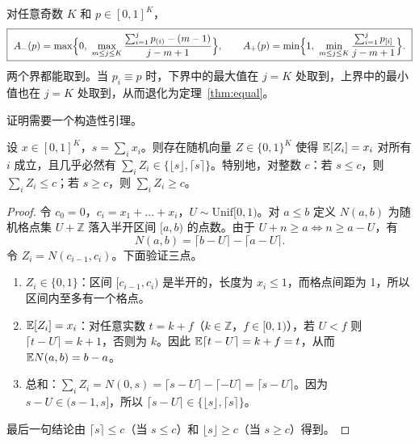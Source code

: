 \documentclass[11pt]{article}
\begin{document}
\begin{theorem}[任意边缘准确率的紧确界]\label{thm:unequal}
对任意奇数 $K$ 和 $p\in[0,1]^K$，
\[
\boxed{\ A_{-}(p)=\max\Bigl\{0,\ \max_{m\le j\le K}\frac{\sum_{i=1}^{j}p_{(i)}-(m-1)}{j-m+1}\Bigr\},\qquad
A_{+}(p)=\min\Bigl\{1,\ \min_{m\le j\le K}\frac{\sum_{i=1}^{j}p_{[i]}}{j-m+1}\Bigr\}.\ }
\]
两个界都能取到。当 $p_i\equiv p$ 时，下界中的最大值在 $j=K$ 处取到，上界中的最小值也在 $j=K$ 处取到，从而退化为定理~\ref{thm:equal}。
\end{theorem}

证明需要一个构造性引理。

\begin{lemma}[系统抽样引理]\label{lem:systematic}
设 $x\in[0,1]^K$，$s=\sum_i x_i$。则存在随机向量 $Z\in\{0,1\}^K$ 使得 $\mathbb{E}[Z_i]=x_i$ 对所有 $i$ 成立，且几乎必然有 $\sum_iZ_i\in\{\lfloor s\rfloor,\lceil s\rceil\}$。特别地，对整数 $c$：若 $s\le c$，则 $\sum_iZ_i\le c$；若 $s\ge c$，则 $\sum_iZ_i\ge c$。
\end{lemma}
\begin{proof}
令 $c_0=0$，$c_i=x_1+\dots+x_i$，$U\sim\mathrm{Unif}[0,1)$。对 $a\le b$ 定义 $N(a,b)$ 为随机格点集 $U+\mathbb Z$ 落入半开区间 $[a,b)$ 的点数。由于 $U+n\ge a\iff n\ge a-U$，有
\[
N(a,b)=\lceil b-U\rceil-\lceil a-U\rceil .
\]
令 $Z_i=N(c_{i-1},c_i)$。下面验证三点。
\begin{enumerate}[label=(\alph*)]
\item $Z_i\in\{0,1\}$：区间 $[c_{i-1},c_i)$ 是半开的，长度为 $x_i\le1$，而格点间距为 1，所以区间内至多有一个格点。
\item $\mathbb{E}[Z_i]=x_i$：对任意实数 $t=k+f$（$k\in\mathbb Z$，$f\in[0,1)$），若 $U<f$ 则 $\lceil t-U\rceil=k+1$，否则为 $k$。因此 $\mathbb{E}\lceil t-U\rceil=k+f=t$，从而 $\mathbb{E} N(a,b)=b-a$。
\item 总和：$\sum_iZ_i=N(0,s)=\lceil s-U\rceil-\lceil -U\rceil=\lceil s-U\rceil$。因为 $s-U\in(s-1,s]$，所以 $\lceil s-U\rceil\in\{\lfloor s\rfloor,\lceil s\rceil\}$。
\end{enumerate}
最后一句结论由 $\lceil s\rceil\le c$（当 $s\le c$）和 $\lfloor s\rfloor\ge c$（当 $s\ge c$）得到。
\end{proof}
\end{document}
